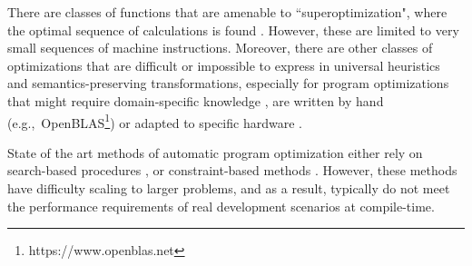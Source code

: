 \documentclass{article}
\begin{document}
There are classes of functions that are amenable to ``superoptimization", where the optimal sequence of calculations is found \citep{massalin1987superoptimizer}. However, these are limited to very small sequences of machine instructions. Moreover, there are other classes of optimizations that are difficult or impossible to express in universal heuristics and semantics-preserving transformations, especially for program optimizations that might require domain-specific knowledge \citep{rinard2006}, are written by hand (e.g.,~OpenBLAS\footnote{https://www.openblas.net}) or adapted to specific hardware \citep{fftw}.

State of the art methods of automatic program optimization either rely on search-based procedures \citep{schkufza2013stochastic}, or constraint-based methods \citep{sasnauskas2017}. However, these methods have difficulty scaling to larger problems, and as a result, typically do not meet the performance requirements of real development scenarios at compile-time.
 



\end{document}
